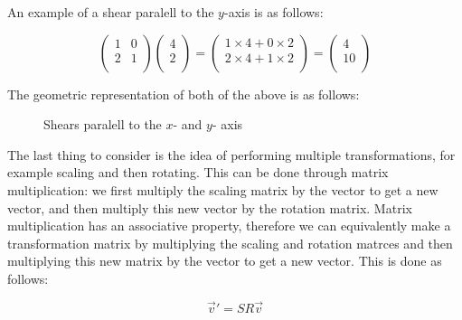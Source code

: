 \documentclass[a4paper,oneside]{report}
\begin{document}
An example of a shear paralell to the \( y \)-axis is as follows:

\[ \begin{pmatrix}
	1 & 0 \\
	2 & 1 \\
\end{pmatrix} \begin{pmatrix}
	4 \\
	2 \\
\end{pmatrix} = \begin{pmatrix}
	1 \times 4 + 0 \times 2 \\
	2 \times 4 + 1 \times 2 \\
\end{pmatrix} = \begin{pmatrix}
	4 \\
	10 \\
\end{pmatrix} \]

The geometric representation of both of the above is as follows:

\begin{figure}[h]
	\centering

	Shears paralell to the \( x \)- and \( y \)- axis
\end{figure}

The last thing to consider is the idea of performing multiple transformations,
for example scaling and then rotating. This can be done through matrix
multiplication: we first multiply the scaling matrix by the vector to get a
new vector, and then multiply this new vector by the rotation matrix. Matrix
multiplication has an associative property, therefore we can equivalently
make a transformation matrix by multiplying the scaling and rotation matrces
and then multiplying this new matrix by the vector to get a new vector. This
is done as follows:

\[ \overrightarrow{v}' = SR\overrightarrow{v} \]
\end{document}
